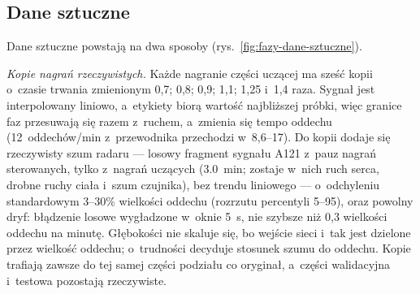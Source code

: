 \documentclass[12pt,a4paper,oneside]{report}
\begin{document}
\subsection{Dane sztuczne}
\label{sec:sieci-dane-sztuczne}
Dane sztuczne powstają na dwa sposoby (rys.~\ref{fig:fazy-dane-sztuczne}).

\emph{Kopie nagrań rzeczywistych.} Każde nagranie części uczącej ma sześć
kopii o~czasie trwania zmienionym 0,7; 0,8; 0,9; 1,1; 1,25 i~1,4 raza.
Sygnał jest interpolowany liniowo, a~etykiety biorą wartość najbliższej
próbki, więc granice faz przesuwają się razem z~ruchem, a~zmienia się tempo
oddechu (12~oddechów/min z~przewodnika przechodzi w~8,6--17). Do kopii
dodaje się rzeczywisty szum radaru --- losowy fragment sygnału A121 z~pauz
nagrań sterowanych, tylko z~nagrań uczących (\SI{3.0}{min}; zostaje w~nich ruch serca, drobne ruchy
ciała i~szum czujnika), bez trendu liniowego --- o~odchyleniu standardowym
3--30\% wielkości oddechu (rozrzutu percentyli 5--95), oraz powolny dryf:
błądzenie losowe wygładzone w~oknie \SI{5}{s}, nie szybsze niż 0,3 wielkości
oddechu na minutę. Głębokości nie skaluje się, bo wejście sieci i~tak jest
dzielone przez wielkość oddechu; o~trudności decyduje stosunek szumu do
oddechu. Kopie trafiają zawsze do tej samej części podziału co oryginał,
a~części walidacyjna i~testowa pozostają rzeczywiste.
\end{document}
